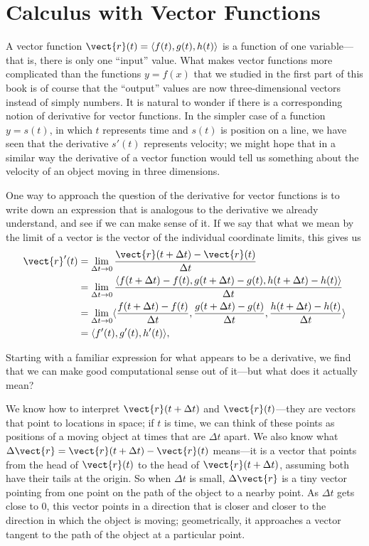 \section{Calculus with Vector Functions}\label{sec:calculus with vector functions}

A vector function $\vect{r}(t)=\langle f(t),g(t),h(t)\rangle$ is a
function of one variable---that is, there is only one ``input''
value. What makes vector functions more complicated than the functions
$y=f(x)$ that we studied in the first part of this book is of course
that the ``output'' values are now three-dimensional vectors instead
of simply numbers. It is natural to wonder if there is a corresponding
notion of derivative for vector functions. In the simpler case of a
function $y=s(t)$, in which $t$ represents time and $s(t)$ is position
on a line, we have seen that the derivative $s'(t)$ represents
velocity; we might hope that in a similar way the derivative of a
vector function would tell us something about the velocity of an
object moving in three dimensions.

One way to approach the question of the derivative for vector
functions is to write down an expression that is analogous to the
derivative we already understand, and see if we can make sense of
it. If we say that what we mean by the limit of a vector is the vector of
the individual coordinate limits, this gives us
\begin{align*}
  \vect{r}^{\prime}(t)&=\lim_{\Delta t\to0}{\vect{r}(t+\Delta t)-\vect{r}(t)\over
  \Delta t}	\\
  &=\lim_{\Delta t\to0}{\langle f(t+\Delta t)-f(t),g(t+\Delta t)-g(t),
  h(t+\Delta t)-h(t)\rangle\over \Delta t}	\\
  &=\lim_{\Delta t\to0}\langle {f(t+\Delta t)-f(t)\over\Delta t},
  {g(t+\Delta t)-g(t)\over\Delta t},
  {h(t+\Delta t)-h(t)\over \Delta t}\rangle	\\
  &=\langle f'(t),g'(t),h'(t)\rangle,
\end{align*}

Starting with a familiar
expression for what appears to be a derivative, we find that we can
make good computational sense out of it---but what does it actually
mean?

We know how to interpret $\vect{r}(t+\Delta t)$ and $\vect{r}(t)$---they
are vectors that point to locations in space; if $t$ is time, we can
think of these points as positions of a moving object at times that
are $\Delta t$ apart. We also know what $\Delta \vect{r}= \vect{r}(t+\Delta t)-\vect{r}(t)$
means---it is a vector that points from the head of $\vect{r}(t)$ to
the head of $\vect{r}(t+\Delta t)$, assuming both have their tails at
the origin. So when $\Delta t$ is small, 
$\Delta \vect{r}$ is a tiny vector pointing from one
point on the path of the object to a nearby point. As $\Delta t$ gets
close to 0, this vector points in a direction that is closer and
closer to the direction in which the object is moving; geometrically,
it approaches a vector tangent to the path of the object at a
particular point.

